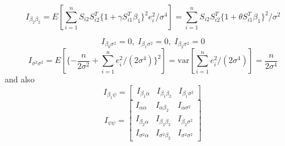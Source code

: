 \documentclass[12pt]{article}
\begin{document}
\begin{equation*}
   I_{\beta_2\beta_2} = E[\sum_{i=1}^n S_{i2}S_{i2}^T\{1 + \gamma S_{i1}^T\beta_1 \}^2e_i^2/\sigma^4] = \sum_{i=1}^n S_{i2}S_{i2}^T\{1 + \theta S_{i1}^T\beta_1 \}^2/\sigma^2
\end{equation*}

\begin{equation*}
I_{\beta_0\sigma^2} = 0,\;
I_{\beta_1\sigma^2} = 0, \;
I_{\beta_2\sigma^2} = 0
\end{equation*}
\begin{equation*}
I_{\sigma^2\sigma^2}  = E[\{-\frac{n}{2\sigma^2} + \sum_{i=1}^n e_i^2/(2\sigma^4)\}^2] = \text{var}[\sum_{i=1}^n e_i^2/(2\sigma^4)] = \frac{n}{2\sigma^4}
\end{equation*}
and also
\begin{equation*}
I_{\beta_1\psi}=
\left[\begin{matrix}
I_{\beta_{1}\alpha}  & I_{\beta_{1}\beta_{2}} & I_{\beta_{1}\sigma^2}
\end{matrix}
\right]
\end{equation*}
\begin{displaymath}
I_{\psi\psi}=
\begin{bmatrix}
I_{\alpha\alpha} & I_{\alpha\beta_{2}} & I_{\alpha\sigma^2} \\
I_{\beta_{2}\alpha} & I_{\beta_{2}\beta_{2}} & I_{\beta_{2}\sigma^2}\\
I_{\sigma^2\alpha} & I_{\sigma^2\beta_{2}} & I_{\sigma^2\sigma^2}
\end{bmatrix}
\end{displaymath}
\end{document}
